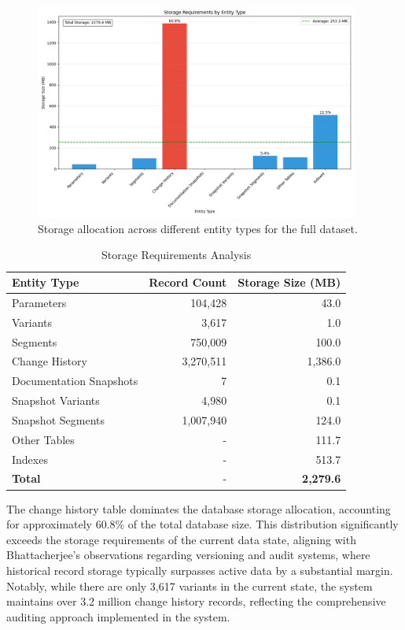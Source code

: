 \begin{figure}[h]
    \centering
    \includegraphics[width=0.95\textwidth]{figures/storage_analysis.png}
    \caption{Storage allocation across different entity types for the full dataset.}
    \label{fig:storage-analysis}
\end{figure}


\begin{table}[h]
\centering
\caption{Storage Requirements Analysis}
\label{tab}
\begin{tabular}{|l|r|r|}
\hline
\textbf{Entity Type} & \textbf{Record Count} & \textbf{Storage Size (MB)} \\
\hline
Parameters & 104,428 & 43.0 \\
\hline
Variants & 3,617 & 1.0 \\
\hline
Segments & 750,009 & 100.0 \\
\hline
Change History & 3,270,511 & 1,386.0 \\
\hline
Documentation Snapshots & 7 & 0.1 \\
\hline
Snapshot Variants & 4,980 & 0.1 \\
\hline
Snapshot Segments & 1,007,940 & 124.0 \\
\hline
Other Tables & - & 111.7 \\
\hline
Indexes & - & 513.7 \\
\hline
\textbf{Total} & - & \textbf{2,279.6} \\
\hline
\end{tabular}
\end{table}

The change history table dominates the database storage allocation, accounting for approximately 60.8\% of the total database size. This distribution significantly exceeds the storage requirements of the current data state, aligning with Bhattacherjee's observations \cite{bhattacherjee2015principles} regarding versioning and audit systems, where historical record storage typically surpasses active data by a substantial margin. Notably, while there are only 3,617 variants in the current state, the system maintains over 3.2 million change history records, reflecting the comprehensive auditing approach implemented in the system.

